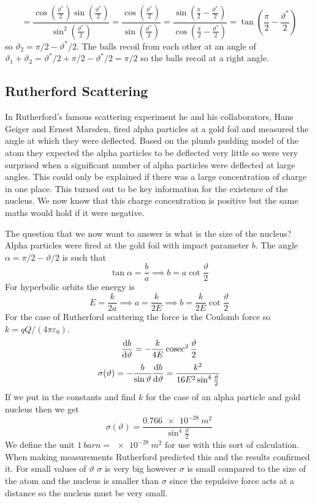 \documentclass{article}
\newcommand{\cosec}{\operatorname{cosec}}
\begin{document}
    \[= \frac{\cos\left(\!\frac{\vartheta^*}{2}\!\right)\sin\left(\!\frac{\vartheta^*}{2}\!\right)}{\sin^2\left(\!\frac{\vartheta^*}{2}\!\right)} = \frac{\cos\left(\!\frac{\vartheta^*}{2}\!\right)}{\sin\left(\!\frac{\vartheta^*}{2}\!\right)} = \frac{\sin\left(\!\frac{\pi}{2} - \frac{\vartheta^*}{2}\!\right)}{\cos\left(\!\frac{\pi}{2} - \frac{\vartheta^*}{2}\!\right)} = \tan\left(\frac{\pi}{2} - \frac{\vartheta^*}{2}\right)\]
    so \(\vartheta_2 = \pi/2 - \vartheta^*/2\).
    The balls recoil from each other at an angle of \(\vartheta_1 + \vartheta_2 = \vartheta^*/2 +\pi/2 - \vartheta^*/2 = \pi/2\) so the balls recoil at a right angle.
    
    \subsection{Rutherford Scattering}
    In Rutherford's famous scattering experiment he and his collaborators, Hans Geiger and Ernest Marsden, fired alpha particles at a gold foil and measured the angle at which they were deflected.
    Based on the plumb pudding model of the atom they expected the alpha particles to be deflected very little so were very surprised when a significant number of alpha particles were deflected at large angles.
    This could only be explained if there was a large concentration of charge in one place.
    This turned out to be key information for the existence of the nucleus.
    We now know that this charge concentration is positive but the same maths would hold if it were negative.
    
    The question that we now want to answer is what is the size of the nucleus?
    Alpha particles were fired at the gold foil with impact parameter \(b\).
    The angle \(\alpha = \pi/2 - \vartheta/2\) is such that
    \[\tan\alpha = \frac{b}{a} \implies b = a\cot\frac{\vartheta}{2}\]
    For hyperbolic orbits the energy is
    \[E = \frac{k}{2a}\implies a = \frac{k}{2E}\implies b = \frac{k}{2E}\cot\frac{\vartheta}{2}\]
    For the case of Rutherford scattering the force is the Coulomb force so \(k = qQ/(4\pi\varepsilon_0)\).
    \[\dv{b}{\vartheta} = -\frac{k}{4E}\cosec^2\frac{\vartheta}{2}\]
    \[\sigma(\vartheta) = -\frac{b}{\sin\vartheta}\dv{b}{\vartheta} = \frac{k^2}{16E^2\sin^4\frac{\vartheta}{2}}\]
    If we put in the constants and find \(k\) for the case of an alpha particle and gold nucleus then we get
    \[\sigma(\vartheta) = \frac{\SI{0.766e-28}{m^2}}{\sin^4\frac{\vartheta}{2}}\]
    We define the unit \(\SI{1}{barn} = \SI{e-28}{m^2}\) for use with this sort of calculation.
    When making measurements Rutherford predicted this and the results confirmed it.
    For small values of \(\vartheta\) \(\sigma\) is very big however \(\sigma\) is small compared to the size of the atom and the nucleus is smaller than \(\sigma\) since the repulsive force acts at a distance so the nucleus must be very small.
    
\end{document}

